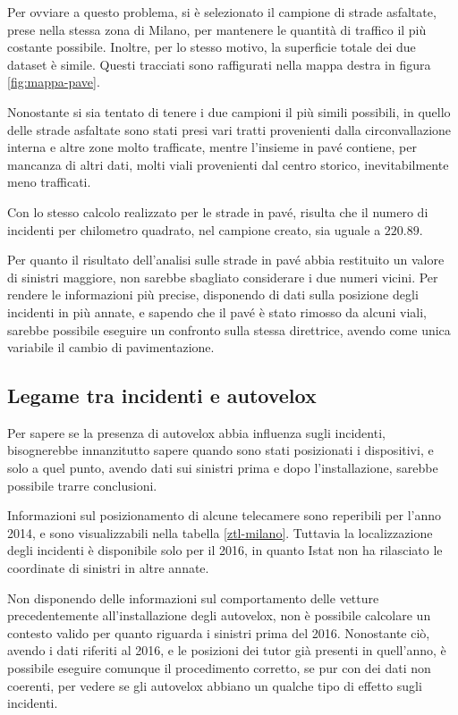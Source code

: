 \documentclass[a4paper]{report}
\begin{document}
Per ovviare a questo problema, si è selezionato il campione di strade asfaltate, 
prese nella stessa zona di Milano, per mantenere le quantità di traffico il più 
costante possibile. 
Inoltre, per lo stesso motivo, la superficie totale dei due dataset è simile. 
Questi tracciati sono raffigurati nella mappa destra in figura \ref{fig:mappa-pave}. 

Nonostante si sia tentato di tenere i due campioni il più simili 
possibili, in quello delle strade asfaltate sono stati presi vari tratti 
provenienti dalla circonvallazione interna e altre zone molto trafficate, 
mentre l'insieme in pavé contiene, per mancanza di altri dati, 
molti viali provenienti dal centro storico, inevitabilmente 
meno trafficati. 

Con lo stesso calcolo realizzato per le strade in pavé, risulta che 
il numero di incidenti per 
chilometro quadrato, nel campione creato, sia uguale a $220.89$. 

Per quanto il risultato dell'analisi sulle strade in pavé abbia restituito un valore di 
sinistri maggiore, non sarebbe sbagliato considerare i due numeri vicini. 
Per rendere le informazioni più precise, disponendo di dati sulla 
posizione degli incidenti in più annate, e sapendo che il pavé è stato 
rimosso da alcuni viali, sarebbe possibile eseguire un confronto 
sulla stessa direttrice, avendo come unica variabile il cambio di pavimentazione. 


\subsection{Legame tra incidenti e autovelox}

Per sapere se la presenza di autovelox abbia influenza sugli incidenti, 
bisognerebbe innanzitutto sapere quando sono stati posizionati i dispositivi, e solo 
a quel punto, avendo dati sui sinistri prima e dopo l'installazione, sarebbe 
possibile trarre conclusioni. 

Informazioni sul posizionamento di alcune telecamere sono reperibili per 
l'anno 2014, e sono visualizzabili nella tabella \ref{ztl-milano}. 
Tuttavia la localizzazione degli incidenti 
è disponibile solo per il 2016, in quanto Istat non ha rilasciato 
le coordinate di sinistri in altre annate. 

Non disponendo delle informazioni sul comportamento delle vetture 
precedentemente all'installazione degli autovelox, 
non è possibile calcolare un contesto valido per quanto riguarda 
i sinistri prima del 2016. 
Nonostante ciò, avendo i dati riferiti al 2016, e le posizioni dei tutor 
già presenti in quell'anno, è possibile eseguire comunque il procedimento corretto, 
se pur con dei dati non coerenti, per vedere se gli 
autovelox abbiano un qualche tipo di effetto sugli incidenti.
\end{document}
